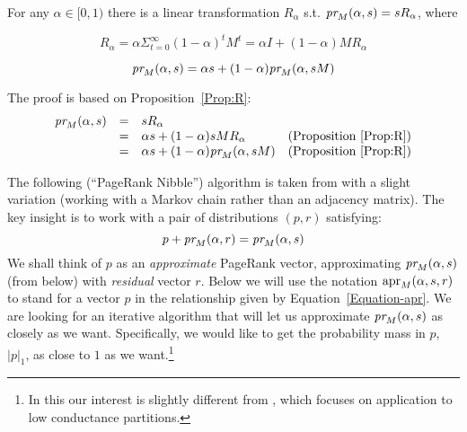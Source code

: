\documentclass{article} %
\begin{document}
\begin{proposition}[Linearity of $\pr_M$]\label{Prop:R}
  For any $\alpha \in [0, 1)$ there is a linear transformation $R_{\alpha}$ s.t. $\mbox{\em pr}_M(\alpha, s) = s R_{\alpha}$, where

$$ R_{\alpha} = \alpha \Sigma_{t=0}^{\infty} (1-\alpha)^t M^t = \alpha I + (1-\alpha)M R_{\alpha}$$
\end{proposition}

\begin{proposition}
  \begin{equation}\label{Equation-key}
     \mbox{\em pr}_M  (\alpha,s)=\alpha s + (1 -\alpha)\mbox{\em pr}_M(\alpha, sM)    
  \end{equation}
\end{proposition}
The proof is based on Proposition~\ref{Prop:R}:
$$
\begin{array}{llll}
 \mbox{\em pr}_M(\alpha,s) &=& sR_{\alpha} \\
&=& \alpha s + (1-\alpha)s M R_{\alpha} & \mbox{(Proposition~\ref{Prop:R})}\\
&=& \alpha s + (1-\alpha)\mbox{\em pr}_M(\alpha,s M) & \mbox{(Proposition~\ref{Prop:R})}
\end{array}
$$

\label{sec:pr-nibble} 
The following (``PageRank Nibble'') algorithm is taken from \cite{Andersen-2006} with a slight variation (working with a Markov chain rather than an adjacency matrix). The key insight is to work with a pair of distributions $(p,r)$ satisfying:
\begin{equation}\label{Equation-apr}
  p + \mbox{\em pr}_M(\alpha,r) = \mbox{\em pr}_M(\alpha,s)
\end{equation}
We shall think of $p$ as an {\em approximate} PageRank vector, approximating $\mbox{\em pr}_M(\alpha,s)$ (from below) with {\em residual} vector $r$. Below we will use the notation $\mbox{apr}_M(\alpha,s,r)$ to stand for a vector $p$ in the relationship given by Equation~\ref{Equation-apr}.  We are looking for an iterative algorithm that will let us approximate $\mbox{\em pr}_M(\alpha,s)$ as closely as we want. Specifically, we would like to get the probability mass in $p$, $|p|_1$, as close to $1$ as we want.\footnote{In this our interest is slightly different from \cite{Andersen-2006}, which focuses on application to low conductance partitions.} 
\end{document}
